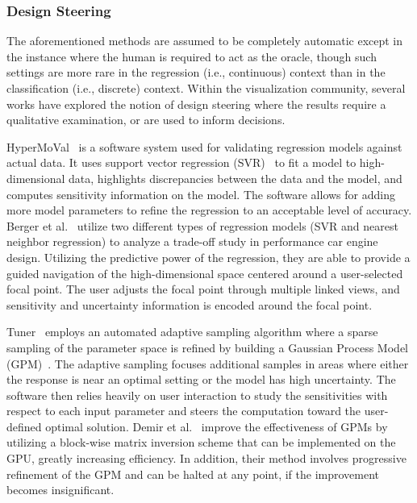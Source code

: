 
\subsubsection{Design Steering}
\label{sec:designSteering}

The aforementioned methods are assumed to be completely automatic except in the instance where the human is required to act as the oracle, though such settings are more rare in the regression (i.e., continuous) context than in the classification (i.e., discrete) context.
%
%
%
Within the visualization community, several works have explored the notion of design steering where the results require a qualitative examination, or are used to inform decisions.

HyperMoVal~\cite{PiringerBergerKrasser2010} is a software system used for validating regression models against actual data.
%
It uses support vector regression (SVR)~\cite{SmolaScholkopf2004} to fit a model to high-dimensional data, highlights discrepancies between the data and the model, and computes sensitivity information on the model.
%
The software allows for adding more model parameters to refine the regression to an acceptable level of accuracy.
%
Berger et al.~\cite{BergerPiringerFilzmoser2011} utilize two different types of regression models (SVR and nearest neighbor regression) to analyze a trade-off study in performance car engine design.
%
Utilizing the predictive power of the regression, they are able to provide a guided navigation of the high-dimensional space centered around a user-selected focal point.
%
The user adjusts the focal point through multiple linked views, and sensitivity and uncertainty information is encoded around the focal point.

Tuner~\cite{Torsney-WeirSaadMoller2011} employs an automated adaptive sampling algorithm where a sparse sampling of the parameter space is refined by building a Gaussian Process Model (GPM)~\cite{RasmussenWilliams2006}.
%
The adaptive sampling focuses additional samples in areas where either the response is near an optimal setting or the model has high uncertainty.
%
The software then relies heavily on user interaction to study the sensitivities with respect to each input parameter and steers the computation toward the user-defined optimal solution.
%
Demir et al.~\cite{DemirWestermann2013} improve the effectiveness of GPMs by utilizing a block-wise matrix inversion scheme that can be implemented on the GPU, greatly increasing efficiency.
%
In addition, their method involves progressive refinement of the GPM and can be halted at any point, if the improvement becomes insignificant.

